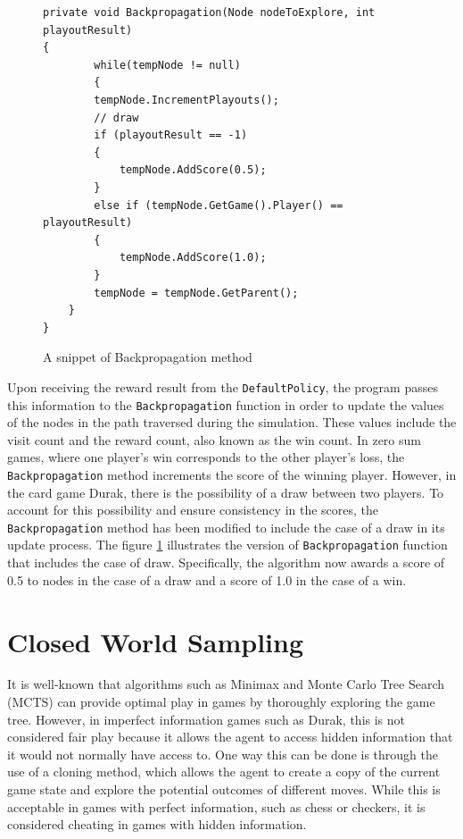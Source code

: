 \begin{figure}[h]
\captionsetup{justification=centering}
\begin{lstlisting}
private void Backpropagation(Node nodeToExplore, int playoutResult)
{
    	while(tempNode != null)
    	{
		tempNode.IncrementPlayouts();
		// draw
		if (playoutResult == -1)
		{
			tempNode.AddScore(0.5);
		} 
		else if (tempNode.GetGame().Player() == playoutResult)
		{
			tempNode.AddScore(1.0);
		}
		tempNode = tempNode.GetParent();
	}
}
\end{lstlisting}
\caption{A snippet of Backpropagation method}
\label{fig:mctsBackpropagation}
\end{figure}

Upon receiving the reward result from the \texttt{DefaultPolicy}, the program passes this information to the \texttt{Backpropagation} function in order to update the values of the nodes in the path traversed during the simulation. These values include the visit count and the reward count, also known as the win count. In zero sum games, where one player's win corresponds to the other player's loss, the \texttt{Backpropagation} method increments the score of the winning player. However, in the card game Durak, there is the possibility of a draw between two players. To account for this possibility and ensure consistency in the scores, the \texttt{Backpropagation} method has been modified to include the case of a draw in its update process. The figure \ref{fig:mctsBackpropagation} illustrates the version of \texttt{Backpropagation} function that includes the case of draw. Specifically, the algorithm now awards a score of 0.5 to nodes in the case of a draw and a score of 1.0 in the case of a win.  


\section{Closed World Sampling}
\label{closedWorld}
It is well-known that algorithms such as Minimax and Monte Carlo Tree Search (MCTS) can provide optimal play in games by thoroughly exploring the game tree. However, in imperfect information games such as Durak, this is not considered fair play because it allows the agent to access hidden information that it would not normally have access to. One way this can be done is through the use of a cloning method, which allows the agent to create a copy of the current game state and explore the potential outcomes of different moves. While this is acceptable in games with perfect information, such as chess or checkers, it is considered cheating in games with hidden information.

